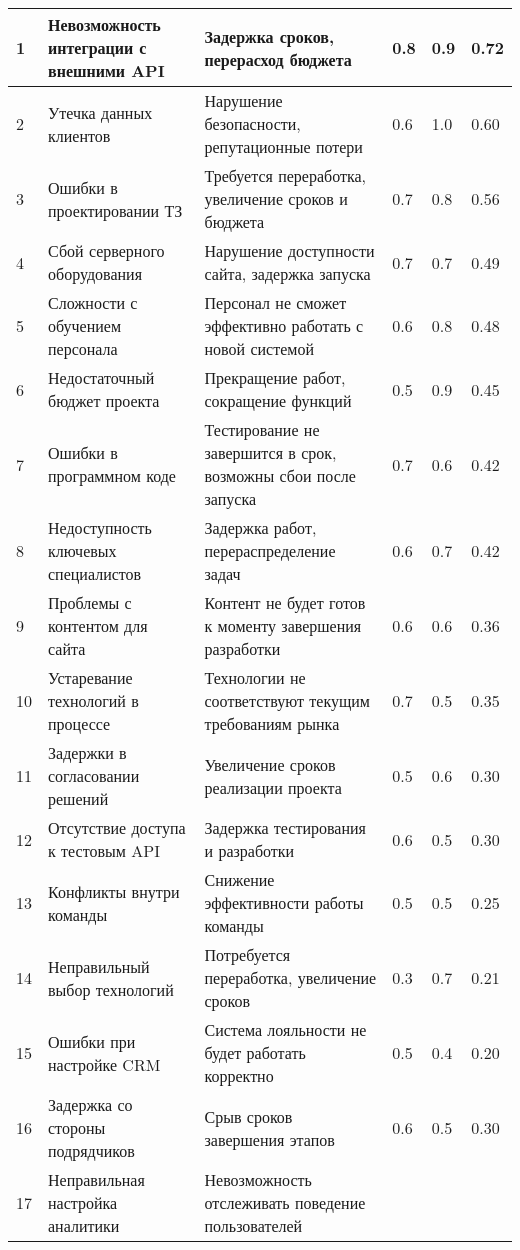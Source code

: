 \begin{small}
\begin{longtable}{|p{0.5cm}|p{3.5cm}|p{4cm}|p{3cm}|p{2cm}|p{1.5cm}|}
		1 & Невозможность интеграции с внешними API
			& Задержка сроков, перерасход бюджета
			& 0.8 & 0.9 & 0.72 \\ \hline
		2 & Утечка данных клиентов
			& Нарушение безопасности, репутационные потери
			& 0.6 & 1.0 & 0.60 \\ \hline
		3 & Ошибки в проектировании ТЗ
			& Требуется переработка, увеличение сроков и бюджета
			& 0.7 & 0.8 & 0.56 \\ \hline
		4 & Сбой серверного оборудования
			& Нарушение доступности сайта, задержка запуска
			& 0.7 & 0.7 & 0.49 \\ \hline
		5 & Сложности с обучением персонала
			& Персонал не сможет эффективно работать с новой системой
			& 0.6 & 0.8 & 0.48 \\ \hline
		6 & Недостаточный бюджет проекта
			& Прекращение работ, сокращение функций
			& 0.5 & 0.9 & 0.45 \\ \hline
		7 & Ошибки в программном коде
			& Тестирование не завершится в срок, возможны сбои после запуска
			& 0.7 & 0.6 & 0.42 \\ \hline
		8 & Недоступность ключевых специалистов
			& Задержка работ, перераспределение задач
			& 0.6 & 0.7 & 0.42 \\ \hline
		9 & Проблемы с контентом для сайта
			& Контент не будет готов к моменту завершения разработки
			& 0.6 & 0.6 & 0.36 \\ \hline
		10 & Устаревание технологий в процессе
			& Технологии не соответствуют текущим требованиям рынка
			& 0.7 & 0.5 & 0.35 \\ \hline
		11 & Задержки в согласовании решений
			& Увеличение сроков реализации проекта
			& 0.5 & 0.6 & 0.30 \\ \hline
		12 & Отсутствие доступа к тестовым API
			& Задержка тестирования и разработки
			& 0.6 & 0.5 & 0.30 \\ \hline
		13 & Конфликты внутри команды
			& Снижение эффективности работы команды
			& 0.5 & 0.5 & 0.25 \\ \hline
		14 & Неправильный выбор технологий
			& Потребуется переработка, увеличение сроков
			& 0.3 & 0.7 & 0.21 \\ \hline
		15 & Ошибки при настройке CRM
			& Система лояльности не будет работать корректно
			& 0.5 & 0.4 & 0.20 \\ \hline
		16 & Задержка со стороны подрядчиков
			& Срыв сроков завершения этапов
			& 0.6 & 0.5 & 0.30 \\ \hline
		17 & Неправильная настройка аналитики
			& Невозможность отслеживать поведение пользователей

\end{longtable}
\end{small}
